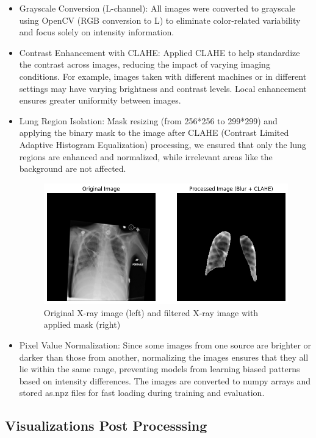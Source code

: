 \documentclass{article}
\begin{document}
\begin{itemize}
    \item Grayscale Conversion (L-channel): All images were converted to grayscale using OpenCV (RGB conversion to L) to eliminate color-related variability and focus solely on intensity information.
    \item Contrast Enhancement with CLAHE: Applied CLAHE to help standardize the contrast across images, reducing the impact of varying imaging conditions. For example, images taken with different machines or in different settings may have varying brightness and contrast levels. Local enhancement ensures greater uniformity between images.
       
    \item Lung Region Isolation: Mask resizing (from 256*256 to 299*299) and applying the binary mask to the image after CLAHE (Contrast Limited Adaptive Histogram Equalization) processing, we ensured that only the lung regions are enhanced and normalized, while irrelevant areas like the background are not affected.

    \begin{figure}[h!] %
        \centering
        \includegraphics[width=0.5\linewidth]{ORIGINAL+PROCESSED IMAGE.png}
        \caption{Original X-ray image (left) and filtered X-ray image with applied mask (right)}
        \label{fig:enter-label}
    \end{figure}
     
    \item Pixel Value Normalization: Since some images from one source are brighter or darker than those from another, normalizing the images ensures that they all lie within the same range, preventing models from learning biased patterns based on intensity differences. The images are converted to numpy arrays and stored as.npz files for fast loading during training and evaluation.

\end{itemize}
\newpage
\subsection{Visualizations Post Processsing}
\end{document}
